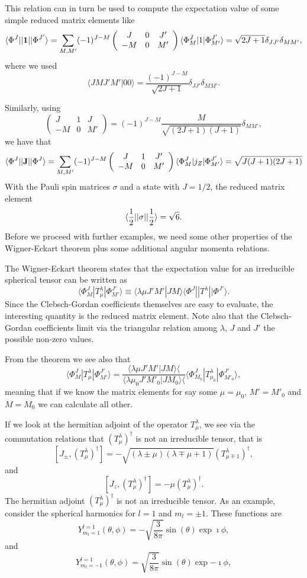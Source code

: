 \documentclass[graybox,sectrefs,envcountresetchap,open=right]{svmonodo}
\begin{document}
This relation can in turn be used to compute the expectation value of some simple reduced matrix elements like
\[
\langle \Phi^J||{\bf 1}||\Phi^{J'}\rangle=\sum_{M,M'}(-1)^{J-M}\left(\begin{array}{ccc}  J & 0 & J' \\ -M & 0 & M'\end{array}\right)\langle \Phi^J_M|1|\Phi^{J'}_{M'}\rangle=\sqrt{2J+1}\delta_{JJ'}\delta_{MM'},
\]
where we used
\[
\langle JM J'M' |00\rangle =\frac{(-1)^{J-M}}{\sqrt{2J+1}}\delta_{JJ'}\delta_{MM'}.
\] 


Similarly, using 
\[
\left(\begin{array}{ccc}  J & 1 & J \\ -M & 0 & M'\end{array}\right)=(-1)^{J-M}\frac{M}{\sqrt{(2J+1)(J+1)}}\delta_{MM'},
\]
we have that 
\[
\langle \Phi^J||{\bf J}||\Phi^{J}\rangle=\sum_{M,M'}(-1)^{J-M}\left(\begin{array}{ccc}  J & 1 & J' \\ -M & 0 & M'\end{array}\right)\langle \Phi^J_M|j_Z|\Phi^{J'}_{M'}\rangle=\sqrt{J(J+1)(2J+1)}
\]
With the Pauli spin matrices $\sigma$ and a state with $J=1/2$, the reduced matrix element
\[
\langle \frac{1}{2}||{\bf \sigma}||\frac{1}{2}\rangle=\sqrt{6}.
\] 
Before we proceed with further examples, we need some other properties of the Wigner-Eckart theorem plus some additional angular momenta relations.


The Wigner-Eckart theorem states that the  expectation value for an irreducible spherical tensor can be written as
\[
\langle \Phi^J_M|T^{\lambda}_{\mu}|\Phi^{J'}_{M'}\rangle\equiv\langle \lambda \mu J'M'|JM\rangle\langle \Phi^J||T^{\lambda}||\Phi^{J'}\rangle.
\]
Since the Clebsch-Gordan coefficients themselves are easy to evaluate, the interesting quantity is the reduced matrix element. Note also that 
the Clebsch-Gordan coefficients limit via the triangular relation among $\lambda$, $J$ and $J'$ the possible non-zero values.

From the theorem we see also that 
\[
\langle \Phi^J_M|T^{\lambda}_{\mu}|\Phi^{J'}_{M'}\rangle=\frac{\langle \lambda \mu J'M'|JM\rangle\langle }{\langle \lambda \mu_0 J'M'_0|JM_0\rangle\langle }\langle \Phi^J_{M_0}|T^{\lambda}_{\mu_0}|\Phi^{J'}_{M'_0}\rangle,
\]
meaning that if we know the matrix elements for say some $\mu=\mu_0$, $M'=M'_0$ and $M=M_0$ we can calculate all other. 



If we look at the hermitian adjoint of the operator $T^{\lambda}_{\mu}$, 
we see via the commutation relations that $(T^{\lambda}_{\mu})^{\dagger}$ is not an irreducible tensor, that is
\[
[J_{\pm}, (T^{\lambda}_{\mu})^{\dagger}]= -\sqrt{(\lambda\pm \mu)(\lambda\mp \mu+1)}(T^{\lambda}_{\mu\mp 1})^{\dagger},
\]
and 
\[
[J_{z}, (T^{\lambda}_{\mu})^{\dagger}]=-\mu (T^{\lambda}_{\mu})^{\dagger}.
\]
The hermitian adjoint $(T^{\lambda}_{\mu})^{\dagger}$ is not an irreducible tensor. As an example, consider the spherical harmonics for 
$l=1$ and $m_l=\pm 1$. These functions are 
\[
Y^{l=1}_{m_l=1}(\theta,\phi)=-\sqrt{\frac{3}{8\pi}}\sin{(\theta)}\exp{\imath\phi},
\]
and
\[
Y^{l=1}_{m_l=-1}(\theta,\phi)=\sqrt{\frac{3}{8\pi}}\sin{(\theta)}\exp{-\imath\phi},
\]
\end{document}
